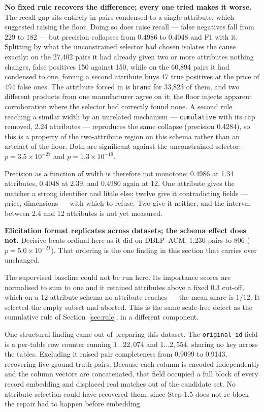 \documentclass[11pt]{article}
\begin{document}
\textbf{No fixed rule recovers the difference; every one tried makes it worse.} The recall
gap sits entirely in pairs condensed to a single attribute, which suggested raising the
floor. Doing so does raise recall --- false negatives fall from 229 to 182 --- but precision
collapses from 0.4986 to 0.4048 and F1 with it. Splitting by what the unconstrained selector
had chosen isolates the cause exactly: on the 27{,}402 pairs it had already given two or more
attributes nothing changes, false positives 150 against 150, while on the 60{,}894 pairs it
had condensed to one, forcing a second attribute buys 47 true positives at the price of 494
false ones. The attribute forced in is \texttt{brand} for 33{,}823 of them, and two different
products from one manufacturer agree on it; the floor injects apparent corroboration where
the selector had correctly found none. A second rule reaching a similar width by an unrelated
mechanism --- \texttt{cumulative} with its cap removed, 2.24 attributes --- reproduces the
same collapse (precision 0.4284), so this is a property of the two-attribute region on this
schema rather than an artefact of the floor. Both are significant against the unconstrained
selector: $p = 3.5\times10^{-27}$ and $p = 1.3\times10^{-19}$.

Precision as a function of width is therefore not monotone: 0.4986 at 1.34 attributes,
0.4048 at 2.39, and 0.4980 again at 12. One attribute gives the matcher a strong identifier
and little else; twelve give it contradicting fields --- price, dimensions --- with which to
refuse. Two give it neither, and the interval between 2.4 and 12 attributes is not yet
measured.

\textbf{Elicitation format replicates across datasets; the schema effect does not.} Decisive
beats ordinal here as it did on DBLP--ACM, 1{,}230 pairs to 806 ($p = 5.0\times10^{-21}$).
That ordering is the one finding in this section that carries over unchanged.

The supervised baseline could not be run here. Its importance scores are normalised to sum
to one and it retained attributes above a fixed 0.3 cut-off, which on a 12-attribute schema
no attribute reaches --- the mean share is $1/12$. It selected the empty subset and aborted.
This is the same scale-free defect as the cumulative rule of Section~\ref{sec:rule}, in a
different component.

One structural finding came out of preparing this dataset. The \texttt{original\_id} field
is a per-table row counter running $1\ldots22{,}074$ and $1\ldots2{,}554$, sharing no key
across the tables. Excluding it raised pair completeness from 0.9099 to 0.9143, recovering
five ground-truth pairs. Because each column is encoded independently and the column vectors
are concatenated, that field occupied a full block of every record embedding and displaced
real matches out of the candidate set. No attribute selection could have recovered them,
since Step 1.5 does not re-block --- the repair had to happen before embedding.
\end{document}
